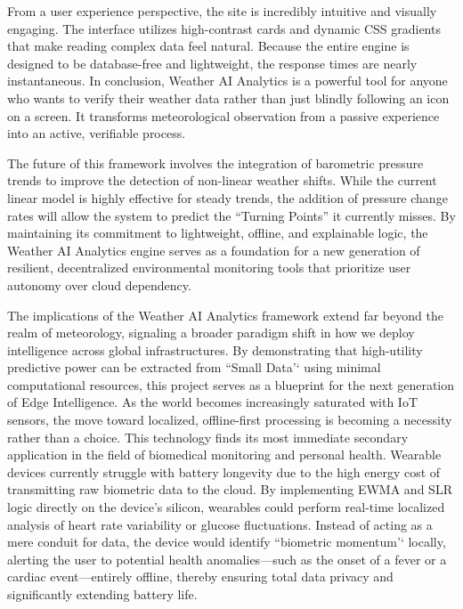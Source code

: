 \documentclass[14pt]{extarticle}
\begin{document}
From a user experience perspective, the site is incredibly intuitive and
visually engaging. The interface utilizes high-contrast cards and dynamic CSS
gradients that make reading complex data feel natural. Because the entire engine
is designed to be database-free and lightweight, the response times are nearly
instantaneous. In conclusion, Weather AI Analytics is a powerful tool for anyone
who wants to verify their weather data rather than just blindly following an
icon on a screen. It transforms meteorological observation from a passive
experience into an active, verifiable process.

\noindent The future of this framework involves the integration of barometric pressure trends to improve the detection of non-linear weather shifts. While the current linear model is highly effective for steady trends, the addition of pressure change rates will allow the system to predict the ``Turning Points'' it currently misses. By maintaining its commitment to lightweight, offline, and explainable logic, the Weather AI Analytics engine serves as a foundation for a new generation of resilient, decentralized environmental monitoring tools that prioritize user autonomy over cloud dependency.

\noindent The implications of the Weather AI Analytics framework extend far
beyond the realm of meteorology, signaling a broader paradigm shift in how we
deploy intelligence across global infrastructures. By demonstrating that
high-utility predictive power can be extracted from ``Small Data'` using minimal
computational resources, this project serves as a blueprint for the next
generation of Edge Intelligence. As the world becomes increasingly saturated
with IoT sensors, the move toward localized, offline-first processing is
becoming a necessity rather than a choice. This technology finds its most
immediate secondary application in the field of biomedical monitoring and
personal health. Wearable devices currently struggle with battery longevity due
to the high energy cost of transmitting raw biometric data to the cloud. By
implementing EWMA and SLR logic directly on the device's silicon, wearables
could perform real-time localized analysis of heart rate variability or glucose
fluctuations. Instead of acting as a mere conduit for data, the device would
identify ``biometric momentum'` locally, alerting the user to potential health
anomalies---such as the onset of a fever or a cardiac event---entirely offline,
thereby ensuring total data privacy and significantly extending battery life.
\end{document}

